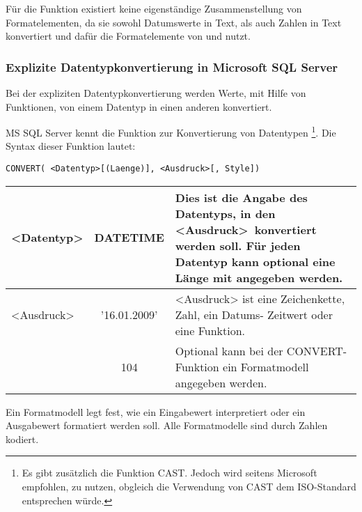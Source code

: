 \begin{merke}
    Für die Funktion  existiert keine eigenständige Zusammenstellung von Formatelementen, da sie sowohl Datumswerte in Text, als auch Zahlen in Text konvertiert und dafür die Formatelemente von  und  nutzt.
\end{merke}

\subsubsection{Explizite Datentypkonvertierung in Microsoft SQL Server}
\begin{merke}
    Bei der expliziten Datentypkonvertierung werden Werte, mit Hilfe von Funktionen, von einem Datentyp in einen anderen konvertiert.
\end{merke}
MS SQL Server kennt die Funktion  zur Konvertierung von Datentypen \footnote{Es gibt zusätzlich die Funktion CAST. Jedoch wird seitens Microsoft empfohlen,  zu nutzen, obgleich die Verwendung von CAST dem ISO-Standard entsprechen würde.}. Die Syntax dieser Funktion lautet:
\begin{lstlisting}[language=ms_sql,caption={Die Syntax der CONVERT-Funktion in MS SQL Server},label=sql03_31]
CONVERT( <Datentyp>[(Laenge)], <Ausdruck>[, Style])
          \end{lstlisting}
\begin{center}
    \label{argconvert}
    \begin{small}
        \tabletail{
            \hline
        }
        \tablelasttail{
            \hline
        }
        \begin{supertabular}{|l|c|p{8.5cm}|}
            \textless Datentyp\textgreater & DATETIME & Dies ist die Angabe des Datentyps, in den \textless Ausdruck\textgreater\ konvertiert werden soll.  Für jeden Datentyp kann optional eine Länge mit angegeben werden.\\
            \hline
            \textless Ausdruck\textgreater & '16.01.2009'& <Ausdruck> ist eine Zeichenkette, Zahl, ein Datums- Zeitwert oder eine Funktion. \\
            \hline
            [Style] & 104 & Optional kann bei der CONVERT-Funktion ein Formatmodell angegeben werden. \\
        \end{supertabular}
    \end{small}
\end{center}
Ein Formatmodell legt fest, wie ein Eingabewert interpretiert oder ein Ausgabewert formatiert werden soll. Alle Formatmodelle sind durch Zahlen kodiert.

